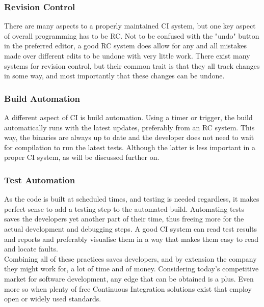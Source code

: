 \documentclass[11pt,british]{article}
\begin{document}
\subsubsection{Revision Control}
There are many aspects to a properly maintained \gls{CI} system, but one key aspect of overall programming has to be \gls{RC}. Not to be confused with the "undo" button in the preferred editor, a good \gls{RC} system does allow for any and all mistakes made over different edits to be undone with very little work. There exist many systems for revision control, but their common trait is that they all track changes in some way, and most importantly that these changes can be undone. 

\subsubsection{Build Automation}
A different aspect of CI is build automation. Using a timer or trigger, the build automatically runs with the latest updates, preferably from an \gls{RC} system. This way, the binaries are always up to date and the developer does not need to wait for compilation to run the latest tests. Although the latter is less important in a proper \gls{CI} system, as will be discussed further on. 

\subsubsection{Test Automation}
As the code is built at scheduled times, and testing is needed regardless, it makes perfect sense to add a testing step to the automated build. Automating tests saves the developers yet another part of their time, thus freeing more for the actual development and debugging steps. A good \gls{CI} system can read test results and reports and preferably visualise them in a way that makes them easy to read and locate faults.
\\[\baselineskip]
Combining all of these practices saves developers, and by extension the company they might work for, a lot of time and of money. Considering today's competitive market for software development, any edge that can be obtained is a plus. Even more so when plenty of free Continuous Integration solutions exist that employ open or widely used standards.\cite{ci1,ci2,ci3}
\end{document}
